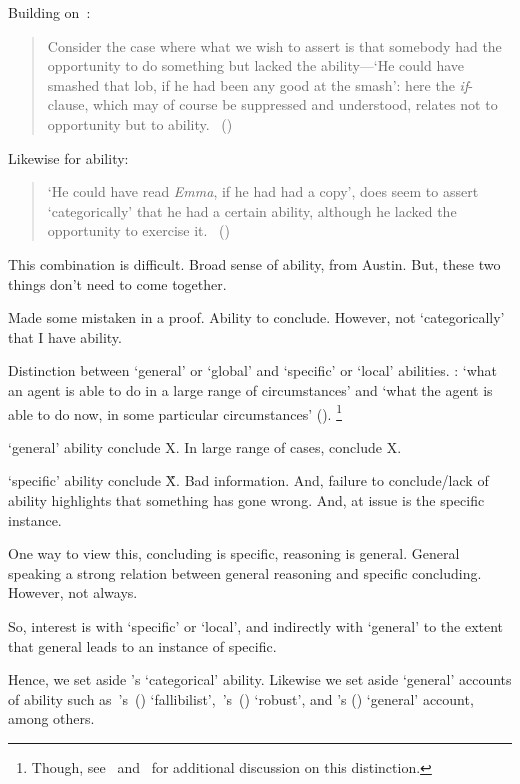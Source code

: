 \begin{note}
  Building on~\citeauthor{Austin:1961vz}:

  \begin{quote}
    Consider the case where what we wish to assert is that somebody had the opportunity to do something but lacked the ability---`He could have smashed that lob, if he had been any good at the smash':
    here the \emph{if}-clause, which may of course be suppressed and understood, relates not to opportunity but to ability.%
    \mbox{ }\hfill\mbox{(\citeyear[177]{Austin:1961vz})}
  \end{quote}
  Likewise for ability:
  \begin{quote}
    `He could have read \emph{Emma}, if he had had a copy', does seem to assert `categorically' that he had a certain ability, although he lacked the opportunity to exercise it.%
    \mbox{ }\hfill\mbox{(\citeyear[177]{Austin:1961vz})}
  \end{quote}

  This combination is difficult.
  Broad sense of ability, from Austin.
  But, these two things don't need to come together.

  Made some mistaken in a proof.
  Ability to conclude.
  However, not `categorically' that I have ability.
\end{note}

\begin{note}
  \nocite{Maier:2018uo}
  Distinction between `general' or `global' and `specific' or `local' abilities.
  \citeauthor{Whittle:2010wr}: `what an agent is able to do in a large range of circumstances' and `what the agent is able to do now, in some particular circumstances' (\citeyear[2]{Whittle:2010wr}).%
  \footnote{
    Though, see~\textcite[esp.\ \S4]{Kittle:2015tb} and~\textcite[1--2]{Kikkert:2022wp} for additional discussion on this distinction.
  }

  `general' ability conclude X.
  In large range of cases, conclude X.

  `specific' ability conclude \~X.
  Bad information.
  And, failure to conclude/lack of ability highlights that something has gone wrong.
  And, at issue is the specific instance.

  One way to view this, concluding is specific, reasoning is general.
  General speaking a strong relation between general reasoning and specific concluding.
  However, not always.

  So, interest is with `specific' or `local', and indirectly with `general' to the extent that general leads to an instance of specific.

  Hence, we set aside \citeauthor{Austin:1961vz}'s `categorical' ability.
  Likewise we set aside `general' accounts of ability such as~\citeauthor{Carter:2021wd}'s~(\citeyear{Carter:2021wd}) `fallibilist',~\citeauthor{Kikkert:2022wp}'s~(\citeyear{Kikkert:2022wp}) `robust', and \citeauthor{Maier:2013vk}'s (\citeyear{Maier:2013vk}) `general' account, among others.
\end{note}

